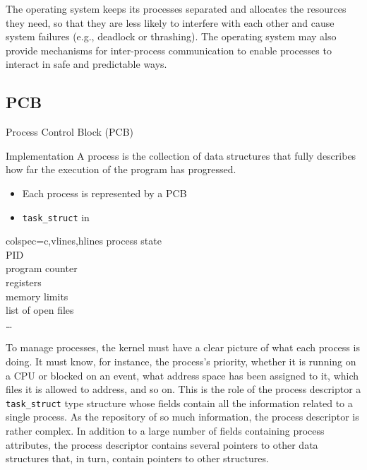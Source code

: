 The operating system keeps its processes separated and allocates the resources they need,
so that they are less likely to interfere with each other and cause system failures (e.g.,
deadlock or thrashing). The operating system may also provide mechanisms for inter-process
communication to enable processes to interact in safe and predictable ways.


\subsection{PCB}
\label{sec:pcb}


\begin{frame}{Process Control Block (PCB)}
  \begin{minipage}{.7\textwidth}
    \begin{block}{Implementation}
        A process is \alert{the collection of data structures} that fully describes how far
        the execution of the program has progressed.
        \begin{itemize}
        \item Each process is represented by a \alert{PCB}
        \item \texttt{task\_struct} in 
        \end{itemize}
      \end{block}
    \end{minipage}\quad
    \begin{minipage}{.2\textwidth}
      \begin{tblr}{colspec={c},vlines,hlines}
        process state\\
        PID\\
        program counter\\
        registers\\
        memory limits\\
        list of open files\\
        \ldots
      \end{tblr}
    \end{minipage}
\end{frame}

To manage processes, the kernel must have a clear picture of what each process is
doing. It must know, for instance, the process's priority, whether it is running on a CPU
or blocked on an event, what address space has been assigned to it, which files it is
allowed to address, and so on. This is the role of the process descriptor a
\texttt{task\_struct} type structure whose fields contain all the information related to a
single process. As the repository of so much information, the process descriptor is rather
complex. In addition to a large number of fields containing process attributes, the
process descriptor contains several pointers to other data structures that, in turn,
contain pointers to other structures.

